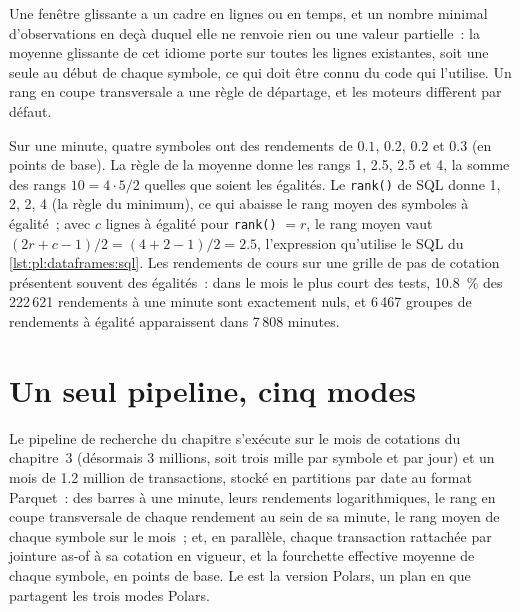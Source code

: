 Une fenêtre glissante a un cadre en lignes ou en temps, et un nombre minimal d'observations en deçà duquel elle ne renvoie rien ou une
valeur partielle~: la moyenne glissante de cet idiome porte sur toutes les lignes existantes, soit une seule au début de chaque symbole, ce qui doit être connu du code qui
l'utilise. Un rang en coupe transversale a une règle de départage, et les moteurs diffèrent par défaut.

\begin{example}\label{ex:pl:dataframes:ties}
Sur une minute, quatre symboles ont des rendements de $0.1$, $0.2$, $0.2$ et $0.3$ (en points de base). La règle de la moyenne donne les rangs 1,
2.5, 2.5 et 4, la somme des rangs $10 = 4\cdot5/2$ quelles que soient les égalités. Le \texttt{rank()} de SQL donne 1, 2, 2, 4 (la règle du minimum), ce qui abaisse
le rang moyen des symboles à égalité~; avec $c$ lignes à égalité pour \texttt{rank()} $= r$, le rang moyen vaut $(2r + c - 1)/2 = (4 + 2 - 1)/2 = 2.5$,
l'expression qu'utilise le SQL du \cref{lst:pl:dataframes:sql}. Les rendements de cours sur une grille de pas de cotation présentent souvent des égalités~: dans le mois le plus court des
tests, 10.8~\% des 222\,621 rendements à une minute sont exactement nuls, et 6\,467 groupes de rendements à égalité apparaissent dans 7\,808 minutes.
\end{example}

\section{Un seul pipeline, cinq modes}

Le pipeline de recherche du chapitre s'exécute sur le mois de cotations du chapitre~3 (désormais 3 millions, soit trois mille par symbole et par jour) et
un mois de 1.2 million de transactions, stocké en partitions par date au format Parquet~: des barres à une minute, leurs rendements logarithmiques, le rang en coupe transversale de
chaque rendement au sein de sa minute, le rang moyen de chaque symbole sur le mois~; et, en parallèle, chaque transaction rattachée par jointure as-of à sa
cotation en vigueur, et la fourchette effective moyenne de chaque symbole, en points de base. Le  est la version Polars, un plan en
 que partagent les trois modes Polars.

\label{lst:pl:dataframes:lazy}

